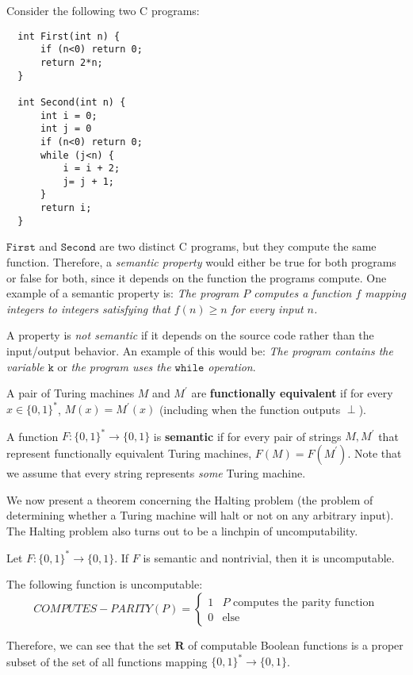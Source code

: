   \begin{example}
  Consider the following two C programs: 
  \begin{lstlisting}
  int First(int n) {
      if (n<0) return 0; 
      return 2*n;
  }

  int Second(int n) {
      int i = 0;
      int j = 0
      if (n<0) return 0; 
      while (j<n) {
          i = i + 2;
          j= j + 1; 
      }
      return i; 
  }
  \end{lstlisting}
  $\texttt{First}$ and $\texttt{Second}$ are two distinct C programs, but they compute the same function. Therefore, a \textit{semantic property} would either be true for both programs or false for both, since it depends on the function the programs compute. One example of a semantic property is: \textit{The program $P$ computes a function $f$ mapping integers to integers satisfying that $f(n) \geq n$ for every input $n$.} 

  A property is \textit{not semantic} if it depends on the source code rather than the input/output behavior. An example of this would be: \textit{The program contains the variable $\texttt{k}$} or \textit{the program uses the $\texttt{while}$ operation}. 
  \end{example}

  \begin{definition}
  A pair of Turing machines $M$ and $M^\prime$ are \textbf{functionally equivalent} if for every $x \in \{0,1\}^*$, $M(x) = M^\prime (x)$ (including when the function outputs $\perp$). 

  A function $F: \{0,1\}^* \longrightarrow \{0,1\}$ is \textbf{semantic} if for every pair of strings $M, M^\prime$ that represent functionally equivalent Turing machines, $F(M) = F(M^\prime)$. Note that we assume that every string represents \textit{some} Turing machine. 
  \end{definition}

  We now present a theorem concerning the Halting problem (the problem of determining whether a Turing machine will halt or not on any arbitrary input). The Halting problem also turns out to be a linchpin of uncomputability. 

  \begin{theorem}
  Let $F: \{0,1\}^* \longrightarrow \{0,1\}$. If $F$ is semantic and nontrivial, then it is uncomputable. 
  \end{theorem}

  \begin{corollary}
  The following function is uncomputable: 
  \[COMPUTES-PARITY(P) = \begin{cases}1 & P \text{ computes the parity function} \\
  0 & \text{else}
  \end{cases}\]
  \end{corollary}

  Therefore, we can see that the set $\mathbf{R}$ of computable Boolean functions is a proper subset of the set of all functions mapping $\{0, 1\}^* \longrightarrow \{0, 1\}$. 

